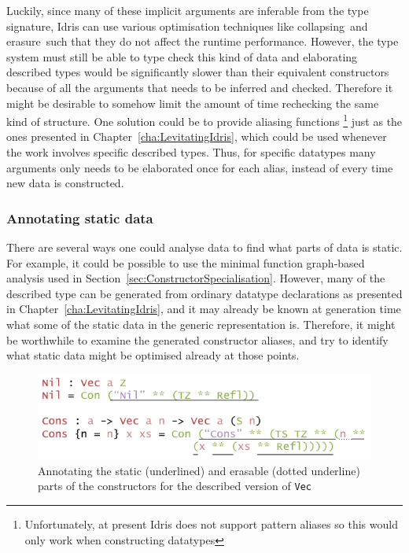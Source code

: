 \documentclass{ituthesis}
\newcommand{\tttype}[1]{\textcolor{type-color}{\texttt{#1}}}
\theoremstyle{break}
\begin{document}
Luckily, since many of these implicit arguments are inferable from the type signature, Idris can use various optimisation techniques like collapsing\,\autocite{Brady04inductivefamilies} and erasure\,\autocite{tejiscak2014erasure} such that they do not affect the runtime performance.
However, the type system must still be able to type check this kind of data and elaborating described types would be significantly slower than their equivalent constructors because of all the arguments that needs to be inferred and checked.
Therefore it might be desirable to somehow limit the amount of time rechecking the same kind of structure.
One solution could be to provide aliasing functions
\footnote{Unfortunately, at present Idris does not support pattern aliases so this would only work when constructing datatypes}
just as the ones presented in Chapter~\ref{cha:LevitatingIdris}, which could be used whenever the work involves specific described types.
Thus, for specific datatypes many arguments only needs to be elaborated once for each alias, instead of every time new data is constructed.

\subsubsection{Annotating static data}
\label{ssub:Annotating static data}
There are several ways one could analyse data to find what parts of data is static.
For example, it could be possible to use the minimal function graph-based analysis used in Section~\ref{sec:ConstructorSpecialisation}.
However, many of the described type can be generated from ordinary datatype declarations as presented in Chapter~\ref{cha:LevitatingIdris}, and it may already be known at generation time what some of the static data in the generic representation is.
Therefore, it might be worthwhile to examine the generated constructor aliases, and try to identify what static data might be optimised already at those points.

\begin{figure}[ht]
\begin{center}
    \includegraphics[scale=0.5]{Figures/VectorSynthesisedConstructorsAnalysis.png}
\end{center}
\caption{Annotating the static (underlined) and erasable (dotted underline) parts of the constructors for the described version of \tttype{Vec}}
\label{fig:btvecctors}
\end{figure}
\end{document}
